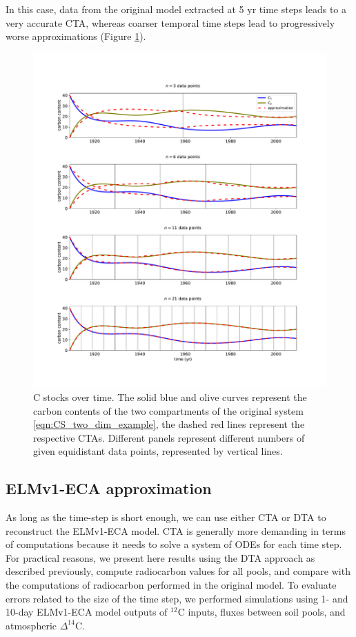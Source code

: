 \documentclass[draft]{agujournal2019}
\begin{document}
     In this case, data from the original model extracted at 5 yr time steps leads to a very accurate CTA, whereas coarser temporal time steps lead to progressively worse approximations (Figure \ref{fig:CS_two_dim_example}).
    \begin{figure}[htbp]
        \centering 
        \includegraphics[width=1.0\linewidth]{figs/interpol_pwc_2.pdf}
        \caption{C stocks over time.
            The solid blue and olive curves represent the carbon contents of the two compartments of the original system \eqref{eqn:CS_two_dim_example}, the dashed red lines represent the respective CTAs. Different panels represent different numbers of given equidistant data points, represented by vertical lines.
            }
        \label{fig:CS_two_dim_example}
    \end{figure}        

\subsection{ELMv1-ECA approximation}
As long as the time-step is short enough, we can use either CTA or DTA to reconstruct the ELMv1-ECA model. CTA is generally more demanding in terms of computations because it needs to solve a system of ODEs for each time step. For practical reasons, we present here results using the DTA approach as described previously, compute radiocarbon values for all pools, and compare with the computations of radiocarbon performed in the original model. To evaluate errors related to the size of the time step, we performed simulations using 1- and 10-day ELMv1-ECA model outputs of $^{12}$C inputs, fluxes between soil pools, and atmospheric $\Delta^{14}$C. 
\end{document}
